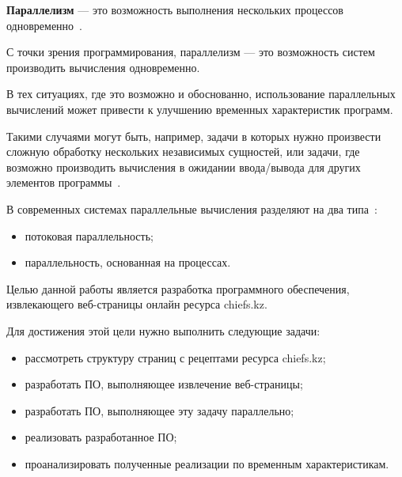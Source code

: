 
\textbf{Параллелизм} --- это возможность выполнения нескольких процессов одновременно~\cite{par-citation}.

С точки зрения программирования, параллелизм --- это возможность систем производить вычисления одновременно.

В тех ситуациях, где это возможно и обоснованно, использование параллельных вычислений может привести к улучшению временных характеристик программ.

Такими случаями могут быть, например, задачи в которых нужно произвести сложную обработку нескольких независимых сущностей, или задачи, где возможно производить вычисления в ожидании ввода/вывода для других элементов программы~\cite{tanenbaum}.

В современных системах параллельные вычисления разделяют на два типа~\cite{tanenbaum}:
\begin{itemize}
  \item потоковая параллельность;
  \item параллельность, основанная на процессах.
\end{itemize}

Целью данной работы является разработка программного обеспечения, извлекающего веб-страницы онлайн ресурса chiefs.kz.

Для достижения этой цели нужно выполнить следующие задачи:
\begin{itemize}
  \item рассмотреть структуру страниц с рецептами ресурса chiefs.kz;
  \item разработать ПО, выполняющее извлечение веб-страницы;
  \item разработать ПО, выполняющее эту задачу параллельно;
  \item реализовать разработанное ПО;
  \item проанализировать полученные реализации по временным характеристикам.
\end{itemize}

\clearpage